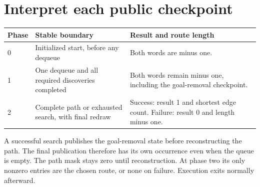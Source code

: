\section{Interpret each public checkpoint}\label{maze-x-checkpoints}
\begin{longtable}{@{}p{15mm}p{57mm}p{86mm}@{}}
  \toprule
  Phase & Stable boundary                                      & Result and route length                                                            \\\midrule\endhead
  0     & Initialized start, before any dequeue                & Both words are minus one.                                                          \\
  1     & One dequeue and all required discoveries completed   & Both words remain minus one, including the goal-removal checkpoint.                \\
  2     & Complete path or exhausted search, with final redraw & Success: result 1 and shortest edge count. Failure: result 0 and length minus one. \\
  \bottomrule
\end{longtable}
A successful search publishes the goal-removal state before reconstructing the path.
The final publication therefore has its own occurrence even when the queue is empty.
The path mask stays zero until reconstruction. At phase two its only nonzero entries
are the chosen route, or none on failure. Execution exits normally afterward.
